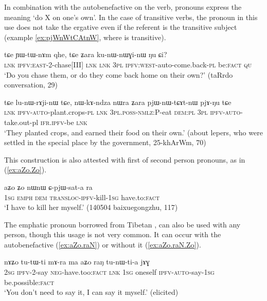 In combination with the autobenefactive  on the verb, pronouns express the meaning `do X on one's own'. In the case of transitive verbs, the pronoun in this use does not take the ergative even if the referent is the transitive subject (example \ref{ex:pjWnWtCAtnW}, where  is transitive).

\begin{exe}
\ex
\gll tɕe ɲɯ-tɯ-nɤm qhe, tɕe ʑara ku-nɯ-nɯɣi-nɯ ŋu ɕi? \\
\textsc{lnk} \textsc{ipfv:east}-2-chase[III] \textsc{lnk} \textsc{lnk} \textsc{3pl} \textsc{ipfv:west}-auto-come.back-\textsc{pl} be:\textsc{fact} \textsc{qu} \\
\glt `Do you chase them, or do they come back home on their own?' (taRrdo conversation, 29)
\end{exe} 

\begin{exe}
\ex \label{ex:pjWnWtCAtnW}
\gll tɕe lu-nɯ-rɤji-nɯ tɕe, nɯ-kɤ-ndza nɯra ʑara pjɯ-nɯ-tɕɤt-nɯ pjɤ-ŋu tɕe \\
\textsc{lnk} \textsc{ipfv-auto}-plant.crops-\textsc{pl} \textsc{lnk} \textsc{3pl.poss-nmlz:P}-eat \textsc{dem:pl} \textsc{3pl} \textsc{ipfv-auto}-take.out-pl \textsc{ifr.ipfv}-be \textsc{lnk} \\
\glt `They planted crops, and earned their food on their own.' (about lepers, who were settled in the special place by the government, 25-khArWm, 70)
\end{exe}

This construction is also attested with first of second person pronouns, as in (\ref{ex:aZo.Zo}).

\begin{exe}
\ex \label{ex:aZo.Zo}
\gll aʑo ʑo nɯnɯ ɕ-pjɯ-sat-a ra \\
\textsc{1sg} \textsc{emph} \textsc{dem} \textsc{transloc-ipfv}-kill-\textsc{1sg} have.to:\textsc{fact} \\
\glt `I have to kill her myself.' (140504 baixuegongzhu, 117)
\end{exe}

The emphatic pronoun  borrowed from Tibetan , can also be used with any person, though this usage is not very common. It can occur with the autobenefactive (\ref{ex:aZo.raN}) or without it (\ref{ex:aZo.raN.Zo}).

\begin{exe}
\ex \label{ex:aZo.raN}
\gll
nɤʑo tu-tɯ-ti mɤ-ra ma aʑo raŋ tu-nɯ-ti-a jɤɣ \\
\textsc{2sg} \textsc{ipfv}-2-say \textsc{neg}-have.too:\textsc{fact} \textsc{lnk} \textsc{1sg} oneself \textsc{ipfv}-\textsc{auto}-say-\textsc{1sg} be.possible:\textsc{fact} \\
\glt `You don't need to say it, I can say it myself.' (elicited)
\end{exe}

